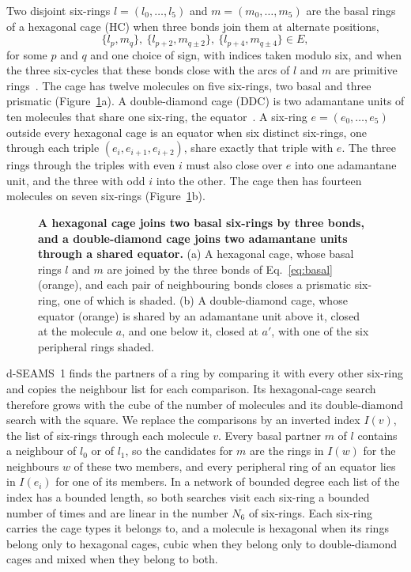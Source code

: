 \documentclass[preprint,12pt]{elsarticle}
\begin{document}
Two disjoint six-rings $l=(l_0,\dots,l_5)$ and $m=(m_0,\dots,m_5)$ are the basal rings of a hexagonal cage (HC) when three bonds join them at alternate positions,
\begin{equation}
  \{l_p,m_q\},\ \{l_{p+2},m_{q\pm 2}\},\ \{l_{p+4},m_{q\pm 4}\}\in E,
  \label{eq:basal}
\end{equation}
for some $p$ and $q$ and one choice of sign, with indices taken modulo six, and when the three six-cycles that these bonds close with the arcs of $l$ and $m$ are primitive rings~\cite{goswami2020dseams}.
The cage has twelve molecules on five six-rings, two basal and three prismatic (Figure~\ref{fig:cages}a).
A double-diamond cage (DDC) is two adamantane units of ten molecules that share one six-ring, the equator~\cite{haji2015nucleation}.
A six-ring $e=(e_0,\dots,e_5)$ outside every hexagonal cage is an equator when six distinct six-rings, one through each triple $(e_i,e_{i+1},e_{i+2})$, share exactly that triple with $e$.
The three rings through the triples with even $i$ must also close over $e$ into one adamantane unit, and the three with odd $i$ into the other.
The cage then has fourteen molecules on seven six-rings (Figure~\ref{fig:cages}b).

\begin{figure}[tbp]
\centering

\caption{\textbf{A hexagonal cage joins two basal six-rings by three bonds, and a double-diamond cage joins two adamantane units through a shared equator.}
(a) A hexagonal cage, whose basal rings $l$ and $m$ are joined by the three bonds of Eq.~\eqref{eq:basal} (orange), and each pair of neighbouring bonds closes a prismatic six-ring, one of which is shaded.
(b) A double-diamond cage, whose equator (orange) is shared by an adamantane unit above it, closed at the molecule $a$, and one below it, closed at $a'$, with one of the six peripheral rings shaded.}
\label{fig:cages}
\end{figure}

d-SEAMS~1 finds the partners of a ring by comparing it with every other six-ring and copies the neighbour list for each comparison.
Its hexagonal-cage search therefore grows with the cube of the number of molecules and its double-diamond search with the square.
We replace the comparisons by an inverted index $I(v)$, the list of six-rings through each molecule $v$.
Every basal partner $m$ of $l$ contains a neighbour of $l_0$ or of $l_1$, so the candidates for $m$ are the rings in $I(w)$ for the neighbours $w$ of these two members, and every peripheral ring of an equator lies in $I(e_i)$ for one of its members.
In a network of bounded degree each list of the index has a bounded length, so both searches visit each six-ring a bounded number of times and are linear in the number $N_6$ of six-rings.
Each six-ring carries the cage types it belongs to, and a molecule is hexagonal when its rings belong only to hexagonal cages, cubic when they belong only to double-diamond cages and mixed when they belong to both.
\end{document}
